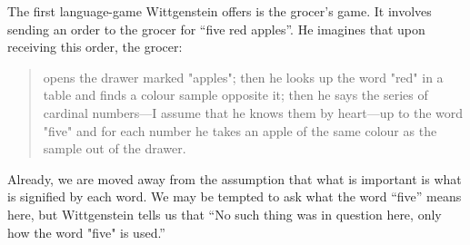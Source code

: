 \documentclass[man,12pt,natbib]{apa6}
\begin{document}
The first language-game Wittgenstein offers is the grocer's game. It involves
sending an order to the grocer for ``five red apples''. He imagines that upon
receiving this order, the grocer:
\begin{quote}
	opens the drawer marked "apples"; then he looks up the word "red" in a
	table and finds a colour sample opposite it; then he says the series of
	cardinal numbers---I assume that he knows them by heart---up to the word
	"five" and for each number he takes an apple of the same colour as the
	sample out of the drawer. \citep[\S 1]{Wittgenstein53}
\end{quote}
Already, we are moved away from the assumption that what is important is what
is signified by each word. 
%
We may be tempted to ask what the word ``five'' means here, but Wittgenstein
tells us that ``No such thing was in question here, only how the word "five"
is used.''
\end{document}
